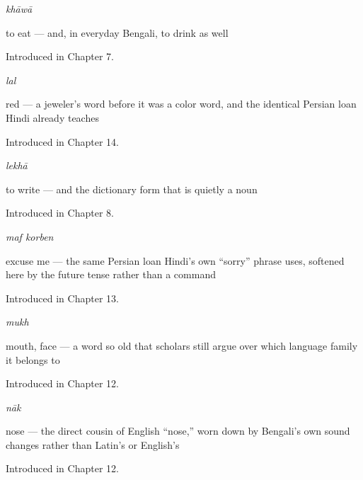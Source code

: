 \noindent\begin{minipage}[t]{\linewidth}
\raggedright
\textbf{}\enspace\emph{khāwā}\par
\small to eat — and, in everyday Bengali, to drink as well\par
\footnotesize Introduced in Chapter 7.
\end{minipage}\par\medskip

\noindent\begin{minipage}[t]{\linewidth}
\raggedright
\textbf{}\enspace\emph{lal}\par
\small red — a jeweler's word before it was a color word, and the identical Persian loan Hindi already teaches\par
\footnotesize Introduced in Chapter 14.
\end{minipage}\par\medskip

\noindent\begin{minipage}[t]{\linewidth}
\raggedright
\textbf{}\enspace\emph{lekhā}\par
\small to write — and the dictionary form that is quietly a noun\par
\footnotesize Introduced in Chapter 8.
\end{minipage}\par\medskip

\noindent\begin{minipage}[t]{\linewidth}
\raggedright
\textbf{ }\enspace\emph{maf korben}\par
\small excuse me — the same Persian loan Hindi's own \textquotedblleft{}sorry\textquotedblright{} phrase uses, softened here by the future tense rather than a command\par
\footnotesize Introduced in Chapter 13.
\end{minipage}\par\medskip

\noindent\begin{minipage}[t]{\linewidth}
\raggedright
\textbf{}\enspace\emph{mukh}\par
\small mouth, face — a word so old that scholars still argue over which language family it belongs to\par
\footnotesize Introduced in Chapter 12.
\end{minipage}\par\medskip

\noindent\begin{minipage}[t]{\linewidth}
\raggedright
\textbf{}\enspace\emph{nāk}\par
\small nose — the direct cousin of English \textquotedblleft{}nose,\textquotedblright{} worn down by Bengali's own sound changes rather than Latin's or English's\par
\footnotesize Introduced in Chapter 12.
\end{minipage}\par\medskip

